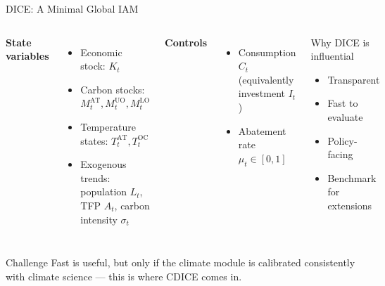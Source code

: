 \documentclass[aspectratio=169,11pt]{beamer}
\newcommand{\emphc}[1]{\textcolor{harvardcrimson}{#1}}
\begin{document}
\begin{frame}{DICE: A Minimal Global IAM}
\small
\begin{columns}[T]
\textbf{State variables}
\begin{itemize}
    \item Economic stock: $K_t$
    \item Carbon stocks: $M_t^{\mathrm{AT}}, M_t^{\mathrm{UO}}, M_t^{\mathrm{LO}}$
    \item Temperature states: $T_t^{\mathrm{AT}}, T_t^{\mathrm{OC}}$
    \item Exogenous trends: population $L_t$, TFP $A_t$, carbon intensity $\sigma_t$
\end{itemize}

\textbf{Controls}
\begin{itemize}
    \item Consumption $C_t$ (equivalently investment $I_t$)
    \item Abatement rate $\mu_t \in [0,1]$
\end{itemize}

\begin{exampleblock}{Why DICE is influential}
\begin{itemize}
    \item Transparent
    \item Fast to evaluate
    \item Policy-facing
    \item Benchmark for extensions
\end{itemize}
\end{exampleblock}
\end{columns}

\begin{alertblock}{Challenge}
Fast is useful, but only if the climate module is calibrated consistently with climate science --- this is where \emphc{CDICE} comes in.
\end{alertblock}
\end{frame}
\end{document}
